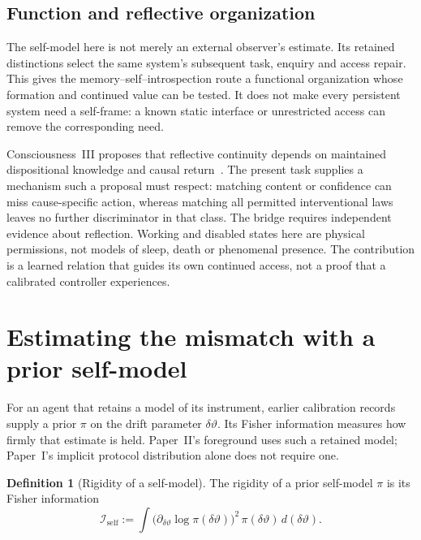 \documentclass[12pt]{article}
\theoremstyle{definition}
\newtheorem{definition}[theorem]{Definition}
\begin{document}
\subsection{Function and reflective organization}
\label{subsec:function}

The self-model here is not merely an external observer's estimate.
Its retained distinctions select the same system's subsequent task,
enquiry and access repair. This gives the memory--self--introspection
route a functional organization whose formation and continued value
can be tested. It does not make every persistent system need a
self-frame: a known static interface or unrestricted access can
remove the corresponding need.

Consciousness~III proposes that reflective continuity depends on
maintained dispositional knowledge and causal return~\cite{Liu2026CIII}.
The present task supplies a mechanism such a proposal must respect:
matching content or confidence can miss cause-specific action, whereas
matching all permitted interventional laws leaves no further
discriminator in that class.
The bridge requires independent evidence about reflection.
Working and disabled states here are physical permissions, not
models of sleep, death or phenomenal presence.
The contribution is a learned relation that guides its own continued
access, not a proof that a calibrated controller experiences.

\appendix

\section{Estimating the mismatch with a prior self-model}
\label{sec:SRCR}

For an agent that retains a model of its instrument, earlier calibration records supply a prior $\pi$ on the drift parameter $\delta\vartheta$. Its Fisher information measures how firmly that estimate is held. Paper~II's foreground uses such a retained model; Paper~I's implicit protocol distribution alone does not require one.

\begin{definition}[Rigidity of a self-model]
\label{def:ego_rigidity}
The rigidity of a prior self-model $\pi$ is its Fisher information
\begin{equation}
\label{eq:ego_rigidity}
\mathcal I_{\mathrm{self}}:=\int\bigl(\partial_{\delta\vartheta}\log\pi(\delta\vartheta)\bigr)^2\,\pi(\delta\vartheta)\,d(\delta\vartheta).
\end{equation}
\end{definition}
\end{document}
